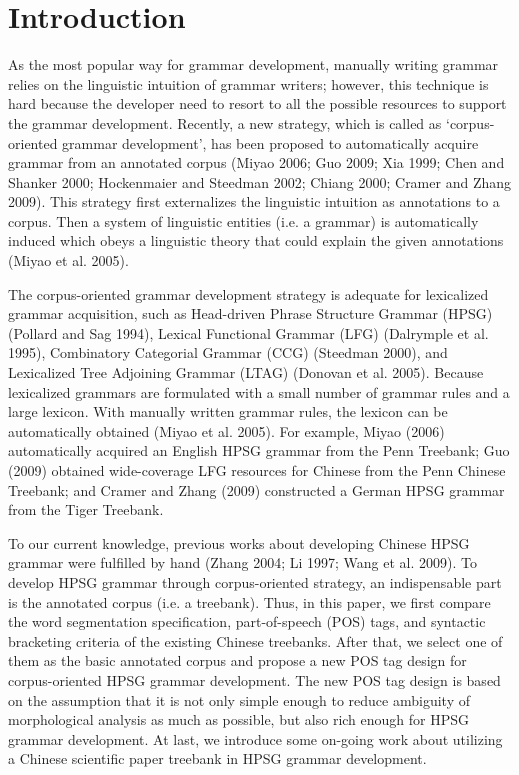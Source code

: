 \documentclass[english]{jnlp_1.4}
\begin{document}
\maketitle

\section{Introduction}

As the most popular way for grammar development, manually writing grammar 
relies on the linguistic intuition of grammar writers; however, this 
technique is hard because the developer need to resort to all the possible 
resources to support the grammar development. Recently, a new strategy, 
which is called as `corpus-oriented grammar development', has been proposed 
to automatically acquire grammar from an annotated corpus (Miyao 2006; Guo 
2009; Xia 1999; Chen and Shanker 2000; Hockenmaier and Steedman 2002; Chiang 
2000; Cramer and Zhang 2009). This strategy first externalizes the 
linguistic intuition as annotations to a corpus. Then a system of linguistic 
entities (i.e. a grammar) is automatically induced which obeys a linguistic 
theory that could explain the given annotations (Miyao et al. 2005). 

The corpus-oriented grammar development strategy is adequate for lexicalized 
grammar acquisition, such as Head-driven Phrase Structure Grammar (HPSG) 
(Pollard and Sag 1994), Lexical Functional Grammar (LFG) (Dalrymple et al. 
1995), Combinatory Categorial Grammar (CCG) (Steedman 2000), and Lexicalized 
Tree Adjoining Grammar (LTAG) (Donovan et al. 2005). Because lexicalized 
grammars are formulated with a small number of grammar rules and a large 
lexicon. With manually written grammar rules, the lexicon can be 
automatically obtained (Miyao et al. 2005). For example, Miyao (2006) 
automatically acquired an English HPSG grammar from the Penn Treebank; Guo 
(2009) obtained wide-coverage LFG resources for Chinese from the Penn 
Chinese Treebank; and Cramer and Zhang (2009) constructed a German HPSG 
grammar from the Tiger Treebank. 

To our current knowledge, previous works about developing Chinese HPSG 
grammar were fulfilled by hand (Zhang 2004; Li 1997; Wang et al. 2009). To 
develop HPSG grammar through corpus-oriented strategy, an indispensable part 
is the annotated corpus (i.e. a treebank). Thus, in this paper, we first 
compare the word segmentation specification, part-of-speech (POS) tags, and 
syntactic bracketing criteria of the existing Chinese treebanks. After that, 
we select one of them as the basic annotated corpus and propose a new POS 
tag design for corpus-oriented HPSG grammar development. The new POS tag 
design is based on the assumption that it is not only simple enough to 
reduce ambiguity of morphological analysis as much as possible, but also 
rich enough for HPSG grammar development. At last, we introduce some 
on-going work about utilizing a Chinese scientific paper treebank in HPSG 
grammar development.
\end{document}
